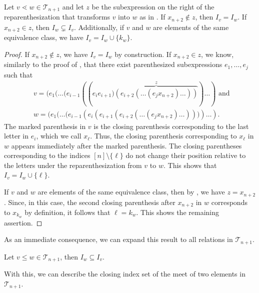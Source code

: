 \documentclass{preprint}
\newcommand{\cT}{\mathcal{T}}
\theoremstyle{definition}
\begin{document}
\begin{lemma}\label{lem: closing parentheses in equivalence class}
    Let $v\lessdot w \in \cT_{n+1}$ and let $z$ be the subexpression on the right of the reparenthesization that transforms $v$ into $w$ as in . If $x_{n+2}\notin z$, then $I_v = I_w$. If $x_{n+2}\in z$, then $I_w\subsetneq I_v$. Additionally, if $v$ and $w$ are elements of the same equivalence class, we have $I_v = I_w \cup \{k_w\}$.
\end{lemma}
\begin{proof}
    If $x_{n+2}\notin z$, we have $I_v=I_w$ by construction. If $x_{n+2} \in z$, we know, similarly to the proof of , that there exist parenthesized subexpressions $e_1,\dots,e_j$ such that
    \begin{align*}
        &v = (e_1(\dots(e_{i-1}((e_ie_{i+1}\pmb{)}\overbrace{(e_{i+2}(\dots(e_j x_{n+2})\dots))}^z)\dots) \text{ and } \\
        &w = (e_1(\dots(e_{i-1}(e_i(e_{i+1}(e_{i+2}(\dots(e_j x_{n+2})\dots))\pmb{)})\dots).
    \end{align*}
    The marked parenthesis in $v$ is the closing parenthesis corresponding to the last letter in $e_i$, which we call $x_\ell$. Thus, the closing parenthesis corresponding to $x_\ell$ in $w$ appears immediately after the marked parenthesis. The closing parentheses corresponding to the indices $[n]\setminus\{\ell\}$ do not change their position relative to the letters under the reparenthesization from $v$ to $w$.
    This shows that $I_v = I_w \cup \{\ell\}$. 

    If $v$ and $w$ are elements of the same equivalence class, then by , we have $z=x_{n+2}$.
    Since, in this case, the second closing parenthesis after $x_{n+2}$ in $w$ corresponds to $x_{k_w}$ by definition, it follows that $\ell = k_w$. This shows the remaining assertion.
\end{proof}

As an immediate consequence, we can expand this result to all relations in $\cT_{n+1}$.

\begin{corollary}\label{cor: closing parenthesis moved to the right}
    Let $v \leq w \in \cT_{n+1}$, then $I_w \subseteq I_v$.
\end{corollary}

With this, we can describe the closing index set of the meet of two elements in $\cT_{n+1}$.
\end{document}
